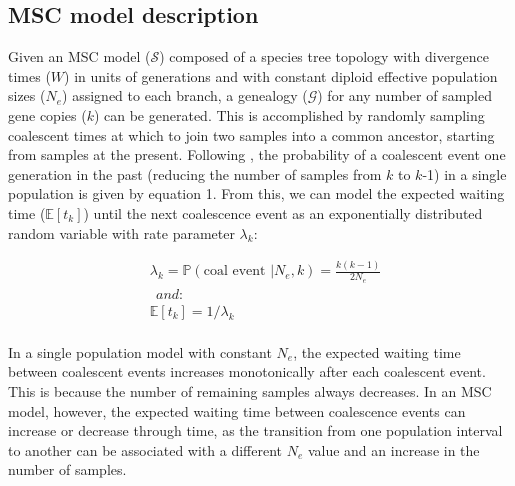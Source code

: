 \documentclass[11pt]{article}
\begin{document}
\subsection{MSC model description}
Given an MSC model ($\mathcal{S}$) composed of a species tree topology with divergence
times ($W$) in units of generations and with constant diploid effective population sizes ($N_e$) 
assigned to each branch, a genealogy ($\mathcal{G}$) 
for any number of sampled gene copies ($k$) can be generated. This is accomplished by randomly sampling 
coalescent times %
at which to join two samples into a common ancestor, 
starting from samples at the present. 
Following \citet{kingman1982coalescent}, the probability of a 
coalescent event one generation in the past (reducing the 
number of samples from $k$ to $k$-1) in a single population
is given by equation 1. From this, we can model the expected 
waiting time ($\mathbb{E}[t_k]$) until the next coalescence event as an 
exponentially distributed random variable with rate parameter $\lambda_k$:

\begin{equation}
\begin{aligned}
	&\lambda_k = \mathbb{P}(\text{coal~event~} | N_e,k) = \frac{k(k-1)}{2N_e}
	\\
	&~~and:
	\\[0.15cm]
	&\mathbb{E}[t_k] = 1 / \lambda_k
	\\[0.15cm]	
\end{aligned}
\end{equation}

\noindent In a single population model
with constant $N_e$, the expected waiting time between coalescent events 
increases monotonically after each coalescent event. This is because the number of 
remaining samples always decreases. In an MSC model, 
however, the expected waiting time between coalescence events can increase or 
decrease through time, as the transition from one population interval to another 
can be associated with a different $N_e$ value and an increase in the number 
of samples.
\end{document}
